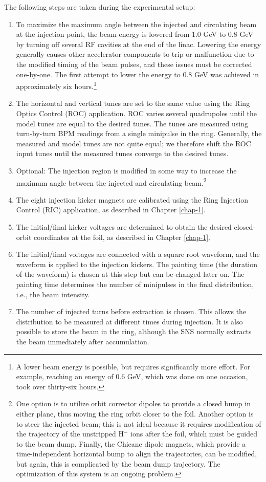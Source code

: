 The following steps are taken during the experimental setup:
%
\begin{enumerate}
    \item 
    To maximize the maximum angle between the injected and circulating beam at the injection point, the beam energy is lowered from 1.0 GeV to 0.8 GeV by turning off several RF cavities at the end of the linac. Lowering the energy generally causes other accelerator components to trip or malfunction due to the modified timing of the beam pulses, and these issues must be corrected one-by-one. The first attempt to lower the energy to 0.8 GeV was achieved in approximately six hours.\footnote{A lower beam energy is possible, but requires significantly more effort. For example, reaching an energy of 0.6 GeV, which was done on one occasion, took over thirty-six hours.}
    \item
    The horizontal and vertical tunes are set to the same value using the Ring Optics Control (ROC) application. ROC varies several quadrupoles until the model tunes are equal to the desired tunes. The tunes are measured using turn-by-turn BPM readings from a single minipulse in the ring. Generally, the measured and model tunes are not quite equal; we therefore shift the ROC input tunes until the measured tunes converge to the desired tunes. 
    \item
    Optional: The injection region is modified in some way to increase the maximum angle between the injected and circulating beam.\footnote{One option is to utilize orbit corrector dipoles to provide a closed bump in either plane, thus moving the ring orbit closer to the foil. Another option is to steer the injected beam; this is not ideal because it requires modification of the trajectory of the unstripped H$^-$ ions after the foil, which must be guided to the beam dump. Finally, the Chicane dipole magnets, which provide a time-independent horizontal bump to align the trajectories, can be modified, but again, this is complicated by the beam dump trajectory. The optimization of this system is an ongoing problem.}
    \item
    The eight injection kicker magnets are calibrated using the Ring Injection Control (RIC) application, as described in Chapter \ref{chap-1}. 
    \item
    The initial/final kicker voltages are determined to obtain the desired closed-orbit coordinates at the foil, as described in Chapter \ref{chap-1}.
    \item
    The initial/final voltages are connected with a square root waveform, and the waveform is applied to the injection kickers. The painting time (the duration of the waveform) is chosen at this step but can be changed later on. The painting time determines the number of minipulses in the final distribution, i.e., the beam intensity.
    \item
    The number of injected turns before extraction is chosen. This allows the distribution to be measured at different times during injection. It is also possible to store the beam in the ring, although the SNS normally extracts the beam immediately after accumulation.
\end{enumerate}
